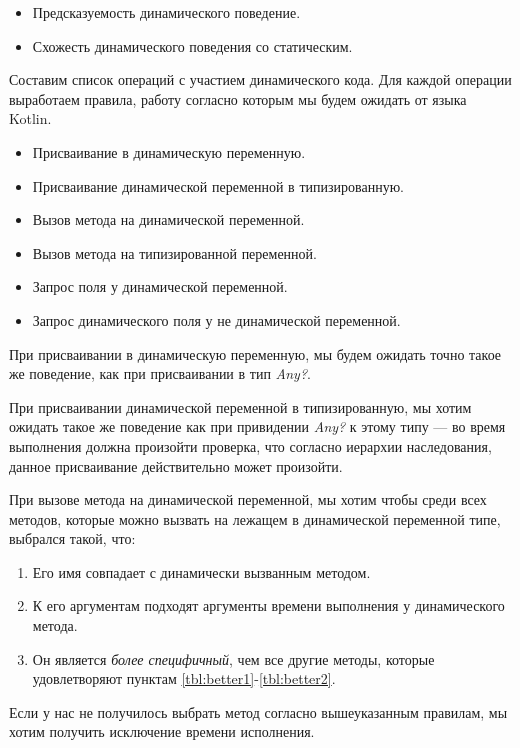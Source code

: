 \begin{itemize}
    \item Предсказуемость динамического поведение.
    \item Схожесть динамического поведения со статическим.
\end{itemize}

Составим список операций с участием динамического кода. Для каждой операции выработаем правила, работу согласно которым мы будем ожидать от языка Kotlin.

\begin{itemize}
    \item Присваивание в динамическую переменную.
    \item Присваивание динамической переменной в типизированную.
    \item Вызов метода на динамической переменной.
    \item Вызов метода на типизированной переменной.
    \item Запрос поля у динамической переменной.
    \item Запрос динамического поля у не динамической переменной.
\end{itemize}

При присваивании в динамическую переменную, мы будем ожидать точно такое же поведение, как при присваивании в тип \textit{Any?}.

При присваивании динамической переменной в типизированную, мы хотим ожидать такое же поведение как при привидении \textit{Any?} к этому типу --- во время выполнения должна произойти проверка, что согласно иерархии наследования, данное присваивание действительно может произойти.%

При вызове метода на динамической переменной, мы хотим чтобы среди всех методов, которые можно вызвать на лежащем в динамической переменной типе, выбрался такой, что:
\begin{enumerate}
    \item Его имя совпадает с динамически вызванным методом. \label{tbl:better1}
    \item К его аргументам подходят аргументы времени выполнения у динамического метода. \label{tbl:better2}
    \item Он является \textit{более специфичный}, чем все другие методы, которые удовлетворяют пунктам \ref{tbl:better1}-\ref{tbl:better2}.
\end{enumerate}

Если у нас не получилось выбрать метод согласно вышеуказанным правилам, мы хотим получить исключение времени исполнения.

